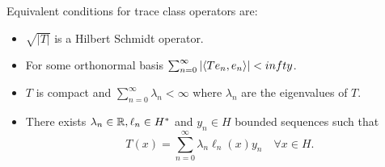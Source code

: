 \documentclass[12pt]{article}
\newcommand{\br}[1]{\left\langle#1\right\rangle}
\begin{document}

Equivalent conditions for trace class operators are:

\begin{itemize}
	\item $\sqrt{|T|} $ is a Hilbert Schmidt operator.
	\item For some orthonormal basis $\sum_{n=0}^{\infty} \abs{\br{Te_n,e_n}}<\\infty$.
	\item $T$ is compact and  $\sum_{n=0}^{\infty} \lambda _n<\infty$ where $\lambda _n$ are the eigenvalues of $T$.
	\item There exists  $\lambda _n \in {\mathbb R},\ell_n \in H^*$ and $y_n \in H$ bounded sequences such that
	      \begin{equation*}
		      T(x)=\sum_{n=0}^{\infty} \lambda _n\ell_n(x)y_n \quad\forall x\in H.
	      \end{equation*}

\end{itemize}
\end{document}

